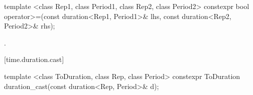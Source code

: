 %
%
\begin{itemdecl}
template <class Rep1, class Period1, class Rep2, class Period2>
  constexpr bool operator>=(const duration<Rep1, Period1>& lhs, const duration<Rep2, Period2>& rhs);
\end{itemdecl}

\begin{itemdescr}
\pnum
\returns {}.
\end{itemdescr}

[time.duration.cast]{}

%
\begin{itemdecl}
template <class ToDuration, class Rep, class Period>
  constexpr ToDuration duration_cast(const duration<Rep, Period>& d);
\end{itemdecl}

